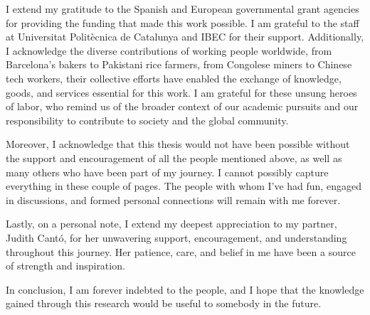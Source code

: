 \begin{Acknowledgements}
	I extend my gratitude to the Spanish and European governmental grant agencies for providing the funding that made this work possible. I am grateful to the staff at Universitat Politècnica de Catalunya and IBEC for their support. Additionally, I acknowledge the diverse contributions of working people worldwide, from Barcelona's bakers to Pakistani rice farmers, from  Congolese miners to Chinese tech workers, their collective efforts have enabled the exchange of knowledge, goods, and services essential for this work. I am grateful for these unsung heroes of labor, who remind us of the broader context of our academic pursuits and our responsibility to contribute to society and the global community.
	
	Moreover, I acknowledge that this thesis would not have been possible without the support and encouragement of all the people mentioned above, as well as many others who have been part of my journey. I cannot possibly capture everything in these couple of pages. The people with whom I've had fun, engaged in discussions, and formed personal connections will remain with me forever.
	
	Lastly, on a personal note, I extend my deepest appreciation to my partner, Judith Cantó, for her unwavering support, encouragement, and understanding throughout this journey. Her patience, care, and belief in me have been a source of strength and inspiration.
	
	In conclusion, I am forever indebted to the people, and I hope that the knowledge gained through this research would be useful to somebody in the future.
	
	
	
	
	
	
	
	
	
	
	
	
	
	
	
	
	
	
	
	
\end{Acknowledgements}
\cleardoublepage